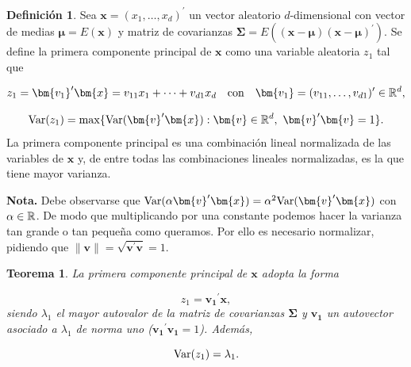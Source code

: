 \documentclass[
  a4paper,
  oneside]{scrbook}
\newtheorem{theorem}{Teorema}[chapter]
\theoremstyle{definition}
\newtheorem{definition}{Definición}[chapter]
\theoremstyle{definition}
\theoremstyle{definition}
\theoremstyle{definition}
\theoremstyle{remark}
\begin{document}
\begin{definition}
\protect\hypertarget{def:unnamed-chunk-70}{}\label{def:unnamed-chunk-70}Sea \(\bm{x}=(x_1,\ldots,x_d)^\prime{}\) un vector aleatorio
\(d\)-dimensional con vector de medias \(\bm\mu=E({\bm{x}})\) y matriz de
covarianzas \(\bm\Sigma=E((\bm{x}-\bm\mu)(\bm{x}-\bm\mu)^\prime{})\). Se
define la primera componente principal de \(\bm{x}\) como una variable
aleatoria \(z_1\) tal que

\[z_1=\bm{v_1}^{\prime}\bm{x}=v_{11}x_1+\cdots+v_{d1}x_d\ \ \ \mbox{con}
\ \ \ \bm{v_1}=(v_{11},\ldots,v_{d1})^{\prime} \in {\Bbb R}^d,\]

\[\textnormal{Var}(z_1)=\max\{\textnormal{Var}(\bm{v}^{\prime}\bm{x}):\bm{v}\in {\Bbb R}^d,\ \bm{v}^{\prime}\bm{v}=1\}.\]
La primera componente principal es una combinación lineal normalizada de
las variables de \(\bm{x}\) y, de entre todas las combinaciones lineales
normalizadas, es la que tiene mayor varianza.
\end{definition}

\textbf{Nota.} Debe observarse que
\(\textnormal{Var}(\alpha \bm{v}^{\prime}\bm{x})=\alpha^2\textnormal{Var}(\bm{v}^{\prime}\bm{x})\)
con \(\alpha\in {\Bbb R}\). De modo que multiplicando por una constante
podemos hacer la varianza tan grande o tan pequeña como queramos. Por
ello es necesario normalizar, pidiendo que
\(\|\bm{v}\|=\sqrt{\bm{v}^{\prime}\bm{v}}=1\).

\begin{theorem}
\protect\hypertarget{thm:unnamed-chunk-71}{}\label{thm:unnamed-chunk-71}La primera componente principal de \(\bm{x}\) adopta la forma

\[z_1=\bm{v_1}^{\prime}\bm{x},\] siendo \(\lambda_1\) el mayor autovalor
de la matriz de covarianzas \(\bm\Sigma\) y \(\bm{v_1}\) un autovector
asociado a \(\lambda_1\) de norma uno (\(\bm{v_1}^{\prime}\bm{v_1}=1\)).
Además,

\[\textnormal{Var}(z_1)=\lambda_1.\]
\end{theorem}
\end{document}
